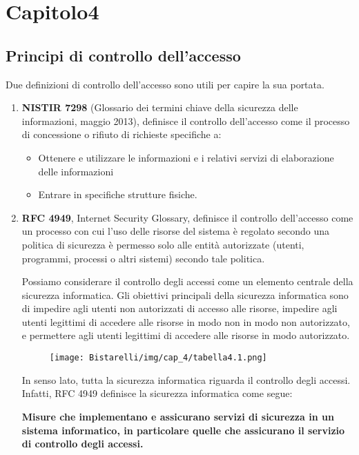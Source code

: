 \newpage
\chapter*{Capitolo4}
\section{Principi di controllo dell'accesso}
Due definizioni di controllo dell'accesso sono utili per capire la sua portata.
\begin{enumerate}
    \item \textbf{NISTIR 7298} (Glossario dei termini chiave della sicurezza delle informazioni, maggio 2013), definisce il controllo dell'accesso come il processo di concessione o rifiuto di richieste specifiche a:
    
    \begin{itemize}
        \item  Ottenere e utilizzare le informazioni e i relativi servizi di elaborazione delle informazioni
        
        \item  Entrare in specifiche strutture fisiche.
    \end{itemize}
    
    \item \textbf{RFC 4949}, Internet Security Glossary, definisce il controllo dell'accesso come un processo con cui l'uso delle risorse del sistema è regolato secondo una politica di sicurezza è permesso solo alle entità autorizzate (utenti, programmi, processi o altri sistemi) secondo tale politica.
    
Possiamo considerare il controllo degli accessi come un elemento centrale della sicurezza informatica. Gli obiettivi principali della sicurezza informatica sono di impedire agli utenti non autorizzati di accesso alle risorse, impedire agli utenti legittimi di accedere alle risorse in modo non in modo non autorizzato, e permettere agli utenti legittimi di accedere alle risorse in modo autorizzato.

\begin{figure}[H]
	\centering
    \texttt{[image: Bistarelli/img/cap\_4/tabella4.1.png]}
\end{figure}

In senso lato, tutta la sicurezza informatica riguarda il controllo degli accessi. Infatti, RFC 4949 definisce la sicurezza informatica come segue:

\begin{center}
    \textbf{Misure che implementano e assicurano servizi di sicurezza in un sistema informatico, in particolare quelle che assicurano il servizio di controllo degli accessi.}
\end{center}
\end{enumerate}
\newpage
